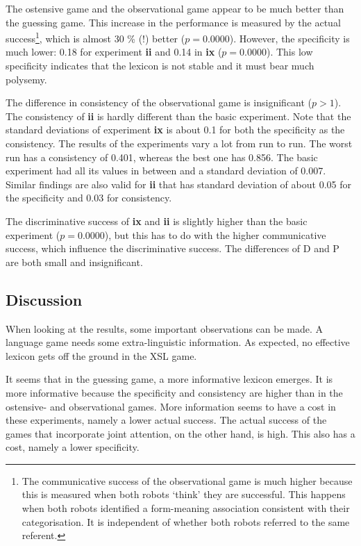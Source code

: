 The ostensive game and the observational game appear to be much better than the guessing game. This increase in the performance is measured by the actual success\footnote{The communicative success of the observational game is much higher because this is measured when both robots `think' they are successful. This happens when both robots identified a form-meaning association consistent with their categorisation. It is independent of whether both robots referred to the same referent.}, which is almost 30 \% (!) better ($p=0.0000$). However, the specificity is much lower: 0.18 for experiment {\bf ii} and 0.14 in {\bf ix} ($p=0.0000$). This low specificity indicates that the lexicon is not stable and it must bear much polysemy.

The difference in consistency of the observational game is insignificant ($p>1$). The consistency of {\bf ii} is hardly different than the basic experiment. Note that the standard deviations of experiment {\bf ix} is about 0.1 for both the specificity as the consistency. The results of the experiments vary a lot from run to run. The worst run has a consistency of 0.401, whereas the best one has 0.856. The basic experiment had all its values in between and a standard deviation of 0.007. Similar findings are also valid for {\bf ii} that has standard deviation of about 0.05 for the specificity and 0.03 for consistency.

The discriminative success of {\bf ix} and {\bf ii} is slightly higher than the basic experiment ($p=0.0000$), but this has to do with the higher communicative success, which influence the discriminative success. The differences of D and P are both small and insignificant.

\subsection{Discussion}

When looking at the results, some important observations can be made. A language game needs some extra-linguistic information. As expected, no effective lexicon gets off the ground in the XSL game. 

It seems that in the guessing game, a more informative lexicon emerges. It is more informative because the specificity and consistency are higher than in the ostensive- and observational games. More information seems to have a cost in these experiments, namely a lower actual success. The actual success of the games that incorporate joint attention, on the other hand, is high. This also has a cost, namely a lower specificity.

